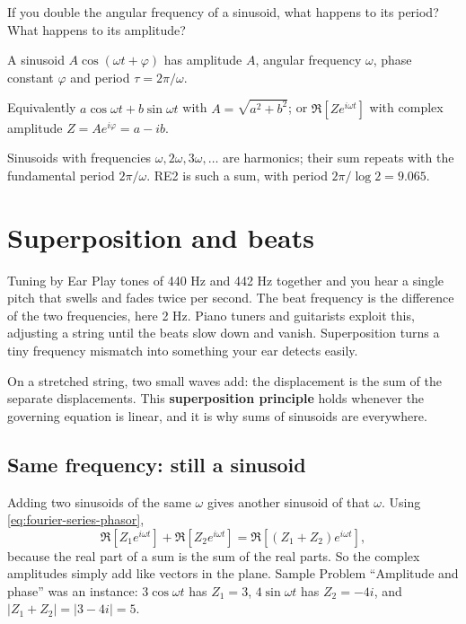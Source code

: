 \begin{checkpoint}
If you double the angular frequency of a sinusoid, what happens to its period? What happens to its amplitude?
\end{checkpoint}

\begin{keyideas}
\item A sinusoid $A\cos(\omega t+\varphi)$ has amplitude $A$, angular frequency $\omega$, phase constant $\varphi$ and period $\tau=2\pi/\omega$.
\item Equivalently $a\cos\omega t+b\sin\omega t$ with $A=\sqrt{a^2+b^2}$; or $\Re[Ze^{i\omega t}]$ with complex amplitude $Z=Ae^{i\varphi}=a-ib$.
\item Sinusoids with frequencies $\omega,2\omega,3\omega,\dots$ are harmonics; their sum repeats with the fundamental period $2\pi/\omega$. RE2 is such a sum, with period $2\pi/\log2=9.065$.
\end{keyideas}

\section{Superposition and beats}\label{sec:fourier-series-beats}
\begin{didyouknow}{Tuning by Ear}
Play tones of 440 Hz and 442 Hz together and you hear a single pitch that swells and fades twice per second. The beat frequency is the difference of the two frequencies, here 2 Hz. Piano tuners and guitarists exploit this, adjusting a string until the beats slow down and vanish. Superposition turns a tiny frequency mismatch into something your ear detects easily.
\end{didyouknow}

On a stretched string, two small waves add: the displacement is the sum of the separate displacements. This \textbf{superposition principle} holds whenever the governing equation is linear, and it is why sums of sinusoids are everywhere.

\subsection{Same frequency: still a sinusoid}

Adding two sinusoids of the same $\omega$ gives another sinusoid of that $\omega$. Using \cref{eq:fourier-series-phasor},
\begin{equation}
\Re[Z_1e^{i\omega t}]+\Re[Z_2e^{i\omega t}]=\Re[(Z_1+Z_2)e^{i\omega t}],
\end{equation}
because the real part of a sum is the sum of the real parts. So the complex amplitudes simply add like vectors in the plane. Sample Problem ``Amplitude and phase'' was an instance: $3\cos\omega t$ has $Z_1=3$, $4\sin\omega t$ has $Z_2=-4i$, and $|Z_1+Z_2|=|3-4i|=5$.

